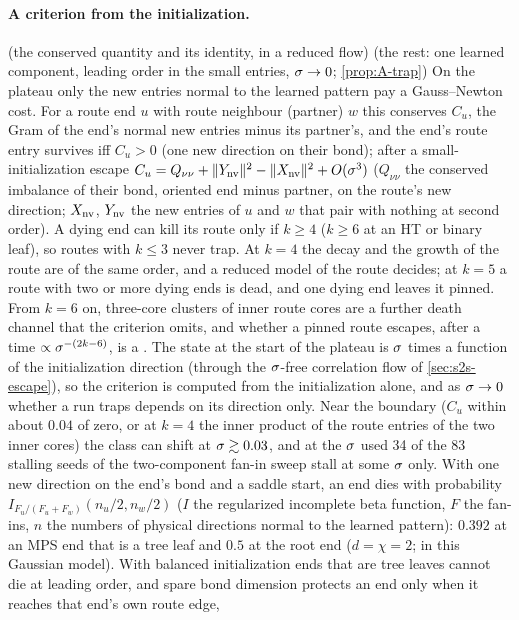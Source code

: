 \paragraph{A criterion from the initialization.}
\proven{} (the conserved quantity and its identity, in a reduced flow) \derived{} (the rest: one learned
component, leading order in the small entries, $\sigma\to0$; \cref{prop:A-trap}) On the plateau only the new entries
normal to the learned pattern pay a Gauss--Newton cost. For a route end $u$ with route neighbour (partner) $w$ this
conserves $C_u$, the Gram of the end's normal new entries minus its partner's, and the end's route entry survives
iff $C_u>0$ (one new direction on their bond); after a small-initialization escape
$C_u=Q_{\nu\nu}+\lVert Y_{\rm nv}\rVert^2-\lVert X_{\rm nv}\rVert^2+O(\sigma^3)$ ($Q_{\nu\nu}$ the conserved imbalance of their bond,
oriented end minus partner, on the route's new direction; $X_{\rm nv}$, $Y_{\rm nv}$ the new entries of $u$ and $w$ that
pair with nothing at second order). A dying end can kill its route only if $k\ge4$ ($k\ge6$ at an HT or binary leaf),
so routes with $k\le3$ never trap. At $k=4$ the decay and the growth of the route are of the same order, and a
reduced model of the route decides; at $k=5$ a route with two or more dying ends is dead, and one dying end leaves it
pinned. From $k=6$ on, three-core
clusters of inner route cores are a further death channel that the criterion omits, and whether a pinned route
escapes, after a time $\propto\sigma^{-(2k-6)}$, is a \conjecture. The state at the start of the plateau is $\sigma$ times a
function of the initialization direction (through the $\sigma$-free correlation flow of \cref{sec:s2s-escape}), so
the criterion is computed from the initialization alone, and as $\sigma\to0$ whether a run traps depends on its
direction only. Near the boundary ($C_u$ within about $0.04$ of zero, or at $k=4$ the inner product of the route
entries of the two inner cores) the class can shift at $\sigma\gtrsim0.03$, and at the $\sigma$ used 34 of the 83 stalling
seeds of the two-component fan-in sweep stall at some $\sigma$ only. With one new direction on the end's bond and a saddle start, an end dies with probability
$I_{F_u/(F_u+F_w)}(n_u/2,n_w/2)$ ($I$ the regularized incomplete beta function, $F$ the fan-ins, $n$ the numbers of
physical directions normal to the learned pattern): $0.392$ at an MPS end that is a tree leaf and $0.5$ at the root
end ($d=\chi=2$; \proven{} in this Gaussian model). With balanced initialization ends that are tree leaves cannot
die at leading order, and spare bond dimension protects an end only when it reaches that end's own route edge,
